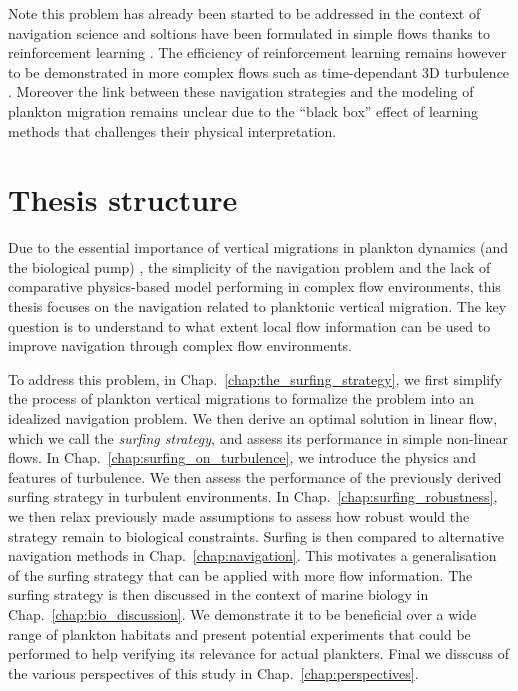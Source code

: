 Note this problem has already been started to be addressed in the context of navigation science and soltions have been formulated in simple flows thanks to reinforcement learning \citep{colabrese2017flow, gustavsson2017finding}. 
The efficiency of reinforcement learning remains however to be demonstrated in more complex flows such as time-dependant 3D turbulence \citep{alageshan2020machine}.
Moreover the link between these navigation strategies and the modeling of plankton migration remains unclear due to the ``black box'' effect of learning methods that challenges their physical interpretation.

\section{Thesis structure}

Due to the essential importance of vertical migrations in plankton dynamics (and the biological pump) \citep{bianchi2013diel, archibald2019modeling}, the simplicity of the navigation problem and the lack of comparative physics-based model performing in complex flow environments, this thesis focuses on the navigation related to planktonic vertical migration.
The key question is to understand to what extent local flow information can be used to improve navigation through complex flow environments.

To address this problem, in Chap.~\ref{chap:the_surfing_strategy}, we first simplify the process of plankton vertical migrations to formalize the problem into an idealized navigation problem.
We then derive an optimal solution in linear flow, which we call the \textit{surfing strategy}, and assess its performance in simple non-linear flows.
In Chap.~\ref{chap:surfing_on_turbulence}, we introduce the physics and features of turbulence. 
We then assess the performance of the previously derived surfing strategy in turbulent environments.
In Chap.~\ref{chap:surfing_robustness}, we then relax previously made assumptions to assess how robust would the strategy remain to biological constraints.
Surfing is then compared to alternative navigation methods in Chap.~\ref{chap:navigation}.
This motivates a generalisation of the surfing strategy that can be applied with more flow information.
The surfing strategy is then discussed in the context of marine biology in Chap.~\ref{chap:bio_discussion}.
We demonstrate it to be beneficial over a wide range of plankton habitats and present potential experiments that could be performed to help verifying its relevance for actual plankters.
Final we disscuss of the various perspectives of this study in Chap.~\ref{chap:perspectives}.

